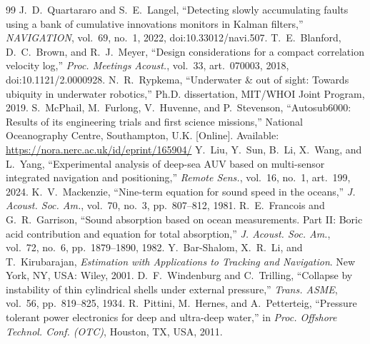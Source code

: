 \documentclass[conference]{IEEEtran}
\begin{document}
\begin{thebibliography}{99}
 J.~D.~Quartararo and S.~E.~Langel, ``Detecting slowly accumulating faults using a bank of cumulative innovations monitors in Kalman filters,'' \emph{NAVIGATION}, vol.~69, no.~1, 2022, doi:10.33012/navi.507.
 T.~E.~Blanford, D.~C.~Brown, and R.~J.~Meyer, ``Design considerations for a compact correlation velocity log,'' \emph{Proc. Meetings Acoust.}, vol.~33, art.~070003, 2018, doi:10.1121/2.0000928.
 N.~R.~Rypkema, ``Underwater \& out of sight: Towards ubiquity in underwater robotics,'' Ph.D. dissertation, MIT/WHOI Joint Program, 2019.
 S.~McPhail, M.~Furlong, V.~Huvenne, and P.~Stevenson, ``Autosub6000: Results of its engineering trials and first science missions,'' National Oceanography Centre, Southampton, U.K. [Online]. Available: \url{https://nora.nerc.ac.uk/id/eprint/165904/}
 Y.~Liu, Y.~Sun, B.~Li, X.~Wang, and L.~Yang, ``Experimental analysis of deep-sea AUV based on multi-sensor integrated navigation and positioning,'' \emph{Remote Sens.}, vol.~16, no.~1, art.~199, 2024.
 K.~V.~Mackenzie, ``Nine-term equation for sound speed in the oceans,'' \emph{J. Acoust. Soc. Am.}, vol.~70, no.~3, pp.~807--812, 1981.
 R.~E.~Francois and G.~R.~Garrison, ``Sound absorption based on ocean measurements. Part II: Boric acid contribution and equation for total absorption,'' \emph{J. Acoust. Soc. Am.}, vol.~72, no.~6, pp.~1879--1890, 1982.
 Y.~Bar-Shalom, X.~R.~Li, and T.~Kirubarajan, \emph{Estimation with Applications to Tracking and Navigation}. New York, NY, USA: Wiley, 2001.
 D.~F.~Windenburg and C.~Trilling, ``Collapse by instability of thin cylindrical shells under external pressure,'' \emph{Trans. ASME}, vol.~56, pp.~819--825, 1934.
 R.~Pittini, M.~Hernes, and A.~Petterteig, ``Pressure tolerant power electronics for deep and ultra-deep water,'' in \emph{Proc. Offshore Technol. Conf. (OTC)}, Houston, TX, USA, 2011.
\end{thebibliography}
\end{document}

